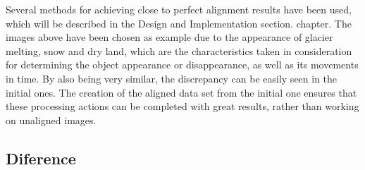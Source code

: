 \documentclass[12pt, a4paper]{report}
\begin{document}
  	Several methods for achieving close to perfect alignment results have been used, which will be described in the Design and Implementation section.
  	chapter. The images above have been chosen as example due to the appearance of glacier melting, snow and dry land, which are the characteristics taken in consideration for determining the object appearance or disappearance, as well as its movements in time. By also being very similar, the discrepancy can be easily seen in the initial ones. 
  	The creation of the aligned data set from the initial one ensures that these processing actions can be completed with great results, rather than working on unaligned images. 
  	
  	\subsection{Diference}
  	
\end{document}
